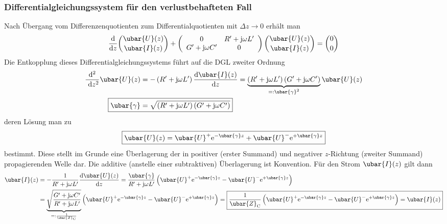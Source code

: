 \subsubsection{Differentialgleichungssystem für den verlustbehafteten Fall}
Nach Übergang vom Differenzenquotienten zum Differentialquotienten mit $\Delta z \rightarrow 0$ erhält man
\begin{equation}
\frac{\mathrm{d}}{\mathrm{d} z}\binom{\ubar{U}(z)}{\ubar{I}(z)}+\left(\begin{array}{cc}
	0 & R^{\prime}+\mathrm{j} \omega L^{\prime}  \\
	G^{\prime}+\mathrm{j} \omega C^{\prime} & 0
\end{array}\right)\binom{\ubar{U}(z)}{\ubar{I}(z)}=\binom{0}{0}
\end{equation}
Die Entkopplung dieses Differentialgleichungssystems führt auf die DGL zweiter Ordnung
\begin{equation}\begin{split}
	\frac{\mathrm{d}^{2}}{\mathrm{~d} z^{2}} \ubar{U}(z)&=-\left(R^{\prime}+\mathrm{j} \omega L^{\prime}\right) \frac{\mathrm{d} \ubar{I}(z)}{\mathrm{d} z}=\underbrace{\left(R^{\prime}+\mathrm{j} \omega L^{\prime}\right)\left(G^{\prime}+\mathrm{j} \omega C^{\prime}\right)}_{=: \ubar{\gamma}^{2}} \ubar{U}(z)\\
	\Aboxed{\ubar{\gamma}&=\sqrt{\left(R^{\prime}+\mathrm{j} \omega L^{\prime}\right)\left(G^{\prime}+\mathrm{j} \omega C^{\prime}\right)}}
\end{split}\end{equation}
deren Lösung man zu
\begin{equation} \label{loesULT}
	\boxed{\ubar{U}(z)=\ubar{U}^{+} \mathrm{e}^{-\ubar{\gamma} z}+\ubar{U}^{-} \mathrm{e}^{+\ubar{\gamma} z} }
\end{equation}
bestimmt. Diese stellt im Grunde eine Überlagerung der in positiver (erster Summand) und negativer $z$-Richtung (zweiter Summand) propagierenden Welle dar. Die additive (anstelle einer subtraktiven) Überlagerung ist Konvention. Für den Strom $\ubar{I}(z)$ gilt dann
\begin{align}
	\ubar{I}(z) & =-\frac{1}{R^{\prime}+\mathrm{j} \omega L^{\prime}} \frac{\mathrm{d} \ubar{U}(z)}{\mathrm{d} z}=\frac{\ubar{\gamma}}{R^{\prime}+\mathrm{j} \omega L^{\prime}}\left(\ubar{U}^{+} \mathrm{e}^{-\ubar{\gamma} z}-\ubar{U}^{-} \mathrm{e}^{+\ubar{\gamma} z}\right)  \\
	& =\underbrace{\sqrt{\frac{G^{\prime}+\mathrm{j} \omega C^{\prime}}{R^{\prime}+\mathrm{j} \omega L^{\prime}}}}_{=: \frac{1}{\ubar{Z}_{\mathrm{C}}}}\left(\ubar{U}^{+} \mathrm{e}^{-\ubar{\gamma} z}-\ubar{U}^{-} \mathrm{e}^{+\ubar{\gamma} z}\right)=\boxed{\frac{1}{\ubar{Z}_{\mathrm{C}}}\left(\ubar{U}^{+} \mathrm{e}^{-\ubar{\gamma} z}-\ubar{U}^{-} \mathrm{e}^{+\ubar{\gamma} z}\right)=\ubar{I}(z)} \label{loesILT}
\end{align}
